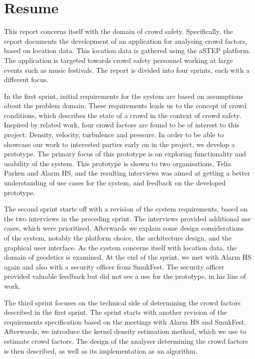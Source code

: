 \chapter*{Resume}

This report concerns itself with the domain of crowd safety. Specifically, the report documents the development of an application for analysing crowd factors, based on location data. This location data is gathered using the aSTEP platform. The application is targeted towards crowd safety personnel working at large events such as music festivals. The report is divided into four sprints, each with a different focus.

In the first sprint, initial requirements for the system are based on assumptions about the problem domain. These requirements leads us to the concept of crowd conditions, which describes the state of a crowd in the context of crowd safety. Inspired by related work, four crowd factors are found to be of interest to this project: Density, velocity, turbulence and pressure. In order to be able to showcase our work to interested parties early on in the project, we develop a prototype. The primary focus of this prototype is on exploring functionality and usability of the system. This prototype is shown to two organisations, Telia Parken and Alarm HS, and the resulting interviews was aimed at getting a better understanding of use cases for the system, and feedback on the developed prototype.

The second sprint starts off with a revision of the system requirements, based on the two interviews in the preceding sprint. The interviews provided additional use cases, which were prioritised. Afterwards we explain some design considerations of the system, notably the platform choice, the architecture design, and the graphical user interface. As the system concerns itself with location data, the domain of geodetics is examined. At the end of the sprint, we met with Alarm HS again and also with a security officer from SmukFest. The security officer provided valuable feedback but did not see a use for the prototype, in his line of work.

The third sprint focuses on the technical side of determining the crowd factors described in the first sprint. The sprint starts with another revision of the requirements specification based on the meetings with Alarm HS and SmukFest. Afterwards, we introduce the kernel density estimation method, which we use to estimate crowd factors. The design of the analyser determining the crowd factors is then described, as well as its implementation as an algorithm.


